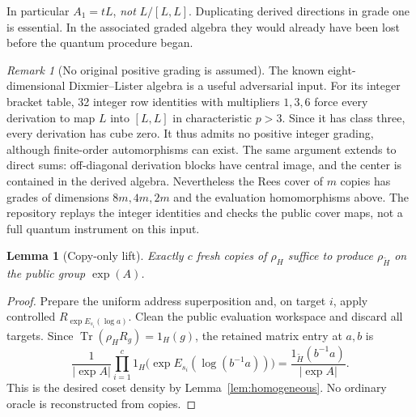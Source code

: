\documentclass[11pt]{article}
\newtheorem{lemma}[theorem]{Lemma}
\theoremstyle{remark}
\newtheorem{remark}[theorem]{Remark}
\newcommand{\tr}{\operatorname{Tr}}
\begin{document}
In particular $A_1=tL$, \emph{not} $L/[L,L]$. Duplicating derived directions
in grade one is essential. In the associated graded algebra they would
already have been lost before the quantum procedure began.

\begin{remark}[No original positive grading is assumed]
The known eight-dimensional Dixmier--Lister algebra
\cite[Section 4.2, Example 2]{bgr} is a useful adversarial input.
For its integer bracket table, 32 integer row identities with multipliers
$1,3,6$ force every derivation to map $L$ into $[L,L]$ in characteristic
$p>3$. Since it has class three, every derivation has cube zero. It thus
admits no positive integer grading, although finite-order automorphisms
can exist. The same argument extends to direct sums: off-diagonal
derivation blocks have central image, and the center is contained in
the derived algebra. Nevertheless the Rees cover of $m$ copies has
grades of dimensions $8m,4m,2m$ and the evaluation homomorphisms above.
The repository replays the integer identities and checks the public
cover maps, not a full quantum instrument on this input.
\end{remark}

\begin{lemma}[Copy-only lift]
Exactly $c$ fresh copies of $\rho_H$ suffice to produce
$\rho_{\widetilde H}$ on the public group $\exp(A)$.
\end{lemma}
\begin{proof}
Prepare the uniform address superposition and, on target $i$, apply
controlled $R_{\exp E_{s_i}(\log a)}$. Clean the public evaluation workspace
and discard all targets. Since $\tr(\rho_H R_g)=1_H(g)$, the retained
matrix entry at $a,b$ is
\[
 \frac1{|\exp A|}\prod_{i=1}^c
  1_H\bigl(\exp E_{s_i}(\log(b^{-1}a))\bigr)
 =\frac{1_{\widetilde H}(b^{-1}a)}{|\exp A|}.
\]
This is the desired coset density by Lemma~\ref{lem:homogeneous}.
No ordinary oracle is reconstructed from copies.
\end{proof}
\end{document}
